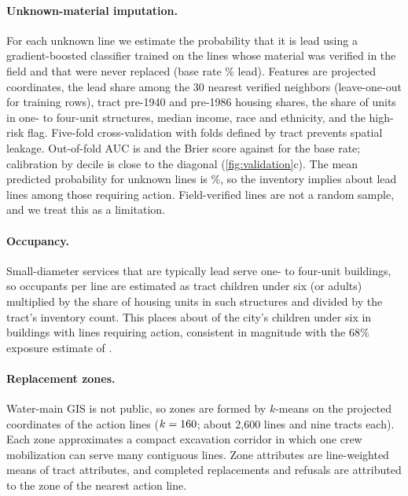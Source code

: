 \documentclass[11pt]{article}
\begin{document}
\paragraph{Unknown-material imputation.} For each unknown line we estimate the probability that it
is lead using a gradient-boosted classifier trained on the \ImpN{} lines whose material was
verified in the field and that were never replaced (base rate \ImpBase\% lead). Features are
projected coordinates, the lead share among the 30 nearest verified neighbors (leave-one-out for
training rows), tract pre-1940 and pre-1986 housing shares, the share of units in one- to
four-unit structures, median income, race and ethnicity, and the high-risk flag. Five-fold
cross-validation with folds defined by tract prevents spatial leakage. Out-of-fold AUC is
\ImpAUC{} and the Brier score \ImpBrier{} against \ImpBrierNull{} for the base rate; calibration by
decile is close to the diagonal (\cref{fig:validation}c). The mean predicted probability for unknown
lines is \PULead\%, so the inventory implies about \NLeadExp{} lead lines among those requiring
action. Field-verified lines are not a random sample, and we treat this as a limitation.

\paragraph{Occupancy.} Small-diameter services that are typically lead serve one- to four-unit
buildings, so occupants per line are estimated as tract children under six (or adults) multiplied by
the share of housing units in such structures and divided by the tract's inventory count. This
places about \KidsServed{} of the city's \KidsCity{} children under six in buildings with lines
requiring action, consistent in magnitude with the 68\% exposure estimate of \citet{huynh2024}.

\paragraph{Replacement zones.} Water-main GIS is not public, so zones are formed by $k$-means on the
projected coordinates of the \NAction{} action lines ($k=160$; about 2,600 lines and nine tracts
each). Each zone approximates a compact excavation corridor in which one crew mobilization can serve
many contiguous lines. Zone attributes are line-weighted means of tract attributes, and completed
replacements and refusals are attributed to the zone of the nearest action line.
\end{document}
